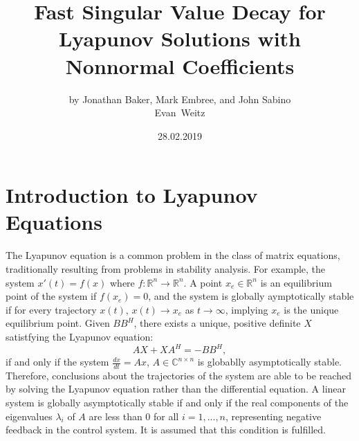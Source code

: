 \documentclass[12pt]{scrartcl}
\newcommand{\Rn}{\mathbb{R}^{n}}
\newcommand{\Cnn}{\mathbb{C}^{n \times n}}
\begin{document}
	


\title{Fast Singular Value Decay for Lyapunov Solutions with Nonnormal Coefficients}

\date{28.02.2019}
\author{\large by Jonathan Baker, Mark Embree, and John Sabino \\ Evan~Weitz}

\maketitle

\thispagestyle{empty}





\section{Introduction to Lyapunov Equations}

The Lyapunov equation is a common problem in the class of matrix equations, traditionally resulting from problems in stability analysis. For example, the system $x'(t) = f(x)$ where $f: \Rn \rightarrow \Rn$. A point $x_{e} \in \Rn$ is an equilibrium point of the system if $f(x_{e}) = 0$, and the system is globally aymptotically stable if for every trajectory $x(t)$, $x(t) \rightarrow x_{e}$ as $t \rightarrow \infty$, implying $x_{e}$ is the unique equilibrium point. Given $BB^{H}$, there exists a unique, positive definite $X$ satistfying the Lyapunov equation: 
$$AX+XA^{H}=-BB^{H},$$
if and only if the system $\frac{dx}{dt}=Ax$, $A \in \Cnn$ is globablly asymptotically stable. \cite{stan} Therefore, conclusions about the trajectories of the system are able to be reached by solving the Lyapunov equation rather than the differential equation. A linear system is globally asymptotically stable if and only if the real components of the eigenvalues $\lambda_{i}$ of $A$ are less than 0 for all $i=1,...,n$, representing negative feedback in the control system. It is assumed that this condition is fulfilled.
\end{document}
